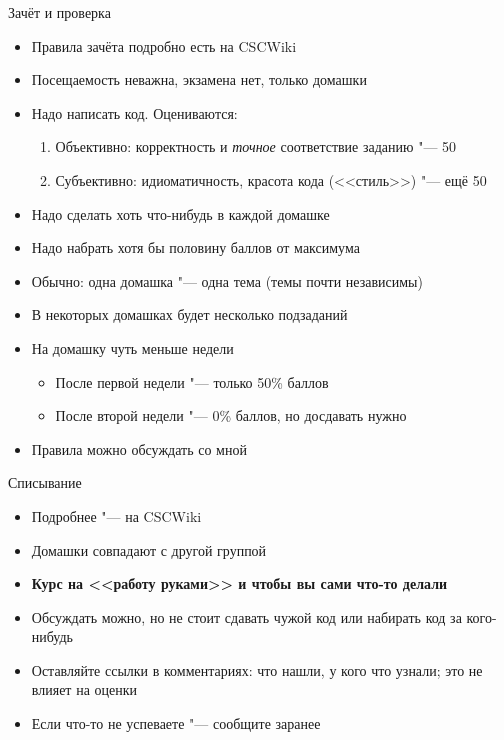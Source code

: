 \begin{frame}[t]{Зачёт и проверка}
	\begin{itemize}
		\item Правила зачёта подробно есть на CSCWiki
		\item Посещаемость неважна, экзамена нет, только домашки
		\item Надо написать код. Оцениваются:
			\begin{enumerate}
			\item Объективно: корректность и \textit{точное} соответствие заданию "--- 50
			\item Субъективно: идиоматичность, красота кода (<<стиль>>) "--- ещё 50
			\end{enumerate}
		\item Надо сделать хоть что-нибудь в каждой домашке
		\item Надо набрать хотя бы половину баллов от максимума
		\item Обычно: одна домашка "--- одна тема (темы почти независимы)
		\item В некоторых домашках будет несколько подзаданий
		\item На домашку чуть меньше недели
			\begin{itemize}
				\item После первой недели "--- только 50\% баллов
				\item После второй недели "--- 0\% баллов, но досдавать нужно
			\end{itemize}
		\item Правила можно обсуждать со мной
	\end{itemize}
\end{frame}

\begin{frame}[t]{Списывание}
	\begin{itemize}
		\item Подробнее "--- на CSCWiki
		\item Домашки совпадают с другой группой
		\item \textbf{Курс на <<работу руками>> и чтобы вы сами что-то делали}
		\item Обсуждать можно, но не стоит сдавать чужой код или набирать код за кого-нибудь
		\item Оставляйте ссылки в комментариях: что нашли, у кого что узнали; это не влияет на оценки
		\item Если что-то не успеваете "--- сообщите заранее
	\end{itemize}
\end{frame}


